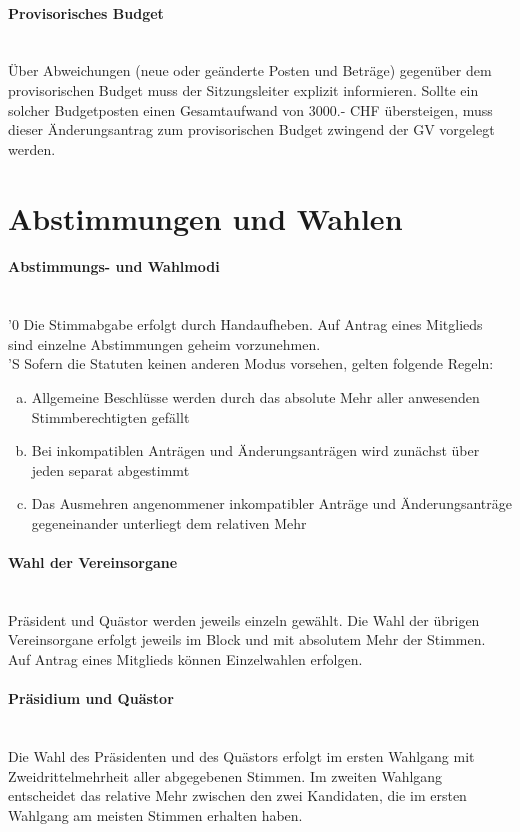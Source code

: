 \documentclass[a4paper,11pt]{article}
\newcommand{\nl}{\\[1.5ex]}
\begin{document}
\paragraph{Provisorisches Budget} \ \\
Über Abweichungen (neue oder geänderte Posten und Beträge) gegenüber dem provisorischen Budget muss der Sitzungsleiter explizit informieren. Sollte ein solcher Budgetposten einen Gesamtaufwand von 3000.- CHF übersteigen, muss dieser Änderungsantrag zum provisorischen Budget zwingend der GV vorgelegt werden.


\section*{Abstimmungen und Wahlen}
\paragraph{Abstimmungs- und Wahlmodi} \ \\
'0 Die Stimmabgabe erfolgt durch Handaufheben. Auf Antrag eines Mitglieds sind einzelne Abstimmungen geheim vorzunehmen. \nl
'S Sofern die Statuten keinen anderen Modus vorsehen, gelten folgende Regeln:
\begin{enumerate}[(a)]
    \item Allgemeine Beschlüsse werden durch das absolute Mehr aller anwesenden Stimmberechtigten gefällt
    \item Bei inkompatiblen Anträgen und Änderungsanträgen wird zunächst über jeden separat abgestimmt
    \item Das Ausmehren angenommener inkompatibler Anträge und Änderungsanträge gegeneinander unterliegt dem relativen Mehr
\end{enumerate}


\paragraph{Wahl der Vereinsorgane} \ \\
Präsident und Quästor werden jeweils einzeln gewählt. Die Wahl der übrigen Vereinsorgane erfolgt jeweils im Block und mit absolutem Mehr der Stimmen. Auf Antrag eines Mitglieds können Einzelwahlen erfolgen.

\paragraph{Präsidium und Quästor} \ \\
Die Wahl des Präsidenten und des Quästors erfolgt im ersten Wahlgang mit Zweidrittelmehrheit aller abgegebenen Stimmen. Im zweiten Wahlgang entscheidet das relative Mehr zwischen den zwei Kandidaten, die im ersten Wahlgang am meisten Stimmen erhalten haben.
\end{document}
